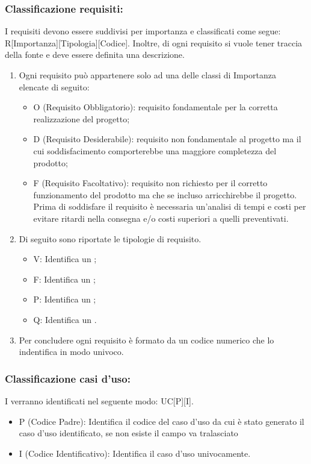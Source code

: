 \documentclass[../NomeDocumento.tex]{subfiles}
\begin{document}
	\subsubsection{Classificazione requisiti:} I requisiti devono essere suddivisi per importanza e classificati come segue: R[Importanza][Tipologia][Codice]. Inoltre, di ogni requisito si vuole tener traccia della fonte e deve essere definita una descrizione.
		\begin{enumerate}
			\item Ogni requisito può appartenere solo ad una delle classi di Importanza elencate di seguito:
			\begin{itemize}
				\item O (Requisito Obbligatorio): requisito fondamentale per la corretta realizzazione del progetto;
				\item D (Requisito Desiderabile): requisito non fondamentale al progetto ma il cui soddisfacimento comporterebbe una maggiore completezza del prodotto;
				\item F (Requisito Facoltativo): requisito non richiesto per il corretto funzionamento del prodotto ma che se incluso arricchirebbe il progetto. Prima di soddisfare il requisito è necessaria un’analisi di tempi e costi per evitare ritardi nella consegna e/o costi superiori a quelli preventivati.
			\end{itemize}
			\item Di seguito sono riportate le tipologie di requisito.
			\begin{itemize}
				\item V: Identifica un ;
				\item F: Identifica un ;
				\item P: Identifica un ;
				\item Q: 
				Identifica un .
			\end{itemize}
		\item Per concludere ogni requisito è formato da un codice numerico che lo indentifica in modo univoco.

		\end{enumerate}
		
	\subsubsection{Classificazione casi d’uso:} 
	I  verranno identificati nel seguente modo: UC[P][I].
	\begin{itemize}
		\item P (Codice Padre): Identifica il codice del caso d'uso da cui è stato generato il caso d'uso identificato, se non esiste il campo va tralasciato
		\item I (Codice Identificativo): Identifica il caso d'uso univocamente.
		\end{itemize}
	
\end{document}
